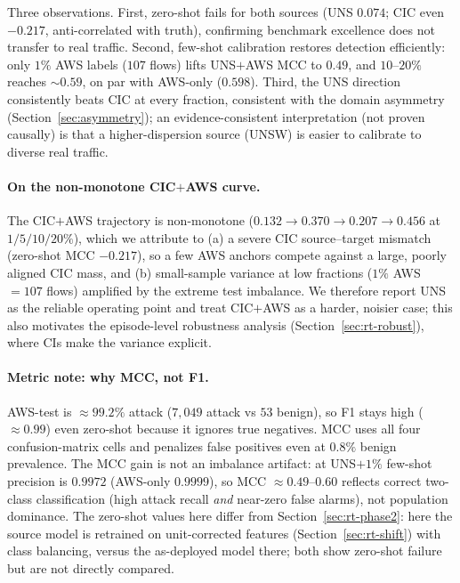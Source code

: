 \documentclass[preprint,12pt,authoryear]{elsarticle}
\begin{document}
Three observations. First, zero-shot fails for both sources (UNS $0.074$; CIC even
$-0.217$, anti-correlated with truth), confirming benchmark excellence does not
transfer to real traffic. Second, few-shot calibration restores detection
efficiently: only $1\%$ AWS labels ($107$ flows) lifts UNS$+$AWS MCC to $0.49$, and
$10$--$20\%$ reaches $\sim 0.59$, on par with AWS-only ($0.598$). Third, the UNS
direction consistently beats CIC at every fraction, consistent with the domain
asymmetry (Section~\ref{sec:asymmetry}); an evidence-consistent interpretation (not
proven causally) is that a higher-dispersion source (UNSW) is easier to calibrate to
diverse real traffic.

\paragraph{On the non-monotone CIC$+$AWS curve.} The CIC$+$AWS trajectory is
non-monotone ($0.132 \to 0.370 \to 0.207 \to 0.456$ at $1/5/10/20\%$), which we
attribute to (a) a severe CIC source--target mismatch (zero-shot MCC $-0.217$), so
a few AWS anchors compete against a large, poorly aligned CIC mass, and (b)
small-sample variance at low fractions ($1\%$ AWS $=107$ flows) amplified by the
extreme test imbalance. We therefore report UNS as the reliable operating point and
treat CIC$+$AWS as a harder, noisier case; this also motivates the episode-level
robustness analysis (Section~\ref{sec:rt-robust}), where CIs make the variance
explicit.

\paragraph{Metric note: why MCC, not F1.} AWS-test is $\approx 99.2\%$ attack
($7{,}049$ attack vs $53$ benign), so F1 stays high ($\approx 0.99$) even zero-shot
because it ignores true negatives. MCC uses all four confusion-matrix cells and
penalizes false positives even at $0.8\%$ benign prevalence. The MCC gain is not an
imbalance artifact: at UNS$+1\%$ few-shot precision is $0.9972$ (AWS-only $0.9999$),
so MCC $\approx 0.49$--$0.60$ reflects correct two-class classification (high attack
recall \emph{and} near-zero false alarms), not population dominance. The zero-shot
values here differ from Section~\ref{sec:rt-phase2}: here the source model is
retrained on unit-corrected features (Section~\ref{sec:rt-shift}) with class
balancing, versus the as-deployed model there; both show zero-shot failure but are
not directly compared.
\end{document}
